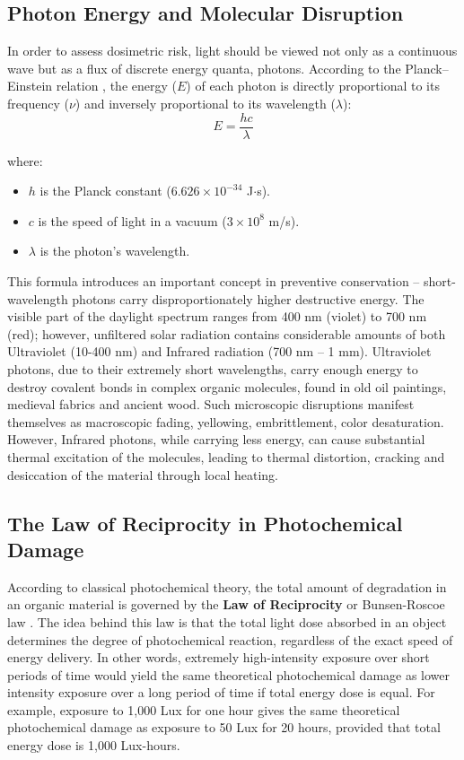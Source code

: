 \subsection{Photon Energy and Molecular Disruption}
In order to assess dosimetric risk, light should be viewed not only as a continuous wave but as a flux of discrete energy quanta, photons. According to the Planck–Einstein relation \cite{einstein1905erzeugung}, the energy ($E$) of each photon is directly proportional to its frequency ($\nu$) and inversely proportional to its wavelength ($\lambda$):
\begin{equation}
    E = \frac{hc}{\lambda}
\end{equation}

where:
\begin{itemize}
    \item $h$ is the Planck constant ($6.626 \times 10^{-34}$ J$\cdot$s).
    \item $c$ is the speed of light in a vacuum ($3 \times 10^8$ m/s).
    \item $\lambda$ is the photon's wavelength.
\end{itemize}

This formula introduces an important concept in preventive conservation – short-wavelength photons carry disproportionately higher destructive energy. The visible part of the daylight spectrum ranges from 400 nm (violet) to 700 nm (red); however, unfiltered solar radiation contains considerable amounts of both Ultraviolet (10-400 nm) and Infrared radiation (700 nm – 1 mm). Ultraviolet photons, due to their extremely short wavelengths, carry enough energy to destroy covalent bonds in complex organic molecules, found in old oil paintings, medieval fabrics and ancient wood. Such microscopic disruptions manifest themselves as macroscopic fading, yellowing, embrittlement, color desaturation. However, Infrared photons, while carrying less energy, can cause substantial thermal excitation of the molecules, leading to thermal distortion, cracking and desiccation of the material through local heating.

\subsection{The Law of Reciprocity in Photochemical Damage}
According to classical photochemical theory, the total amount of degradation in an organic material is governed by the \textbf{Law of Reciprocity} or Bunsen-Roscoe law \cite{bunsen1859photochemical}. The idea behind this law is that the total light dose absorbed in an object determines the degree of photochemical reaction, regardless of the exact speed of energy delivery. In other words, extremely high-intensity exposure over short periods of time would yield the same theoretical photochemical damage as lower intensity exposure over a long period of time if total energy dose is equal. For example, exposure to 1,000 Lux for one hour gives the same theoretical photochemical damage as exposure to 50 Lux for 20 hours, provided that total energy dose is 1,000 Lux-hours.

